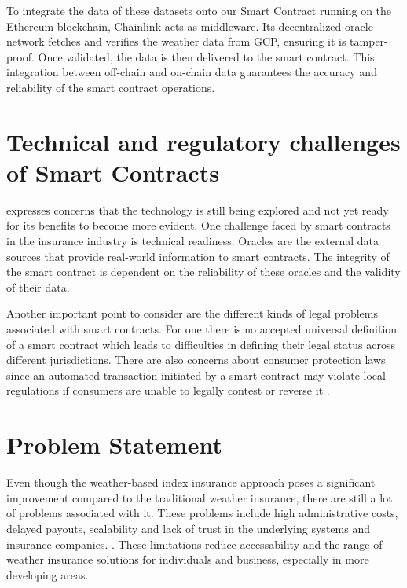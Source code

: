  To integrate the data of these datasets onto our Smart Contract running on the Ethereum blockchain, Chainlink acts as middleware. Its decentralized oracle network fetches and verifies the weather data from GCP, ensuring it is tamper-proof. Once validated, the data is then delivered to the smart contract. This integration between off-chain and on-chain data guarantees the accuracy and reliability of the smart contract operations. \autocite{goswami2022towards}
 
 \section{Technical and regulatory challenges of Smart Contracts}\label{section:regulatory_technical_challenges}
 
 \autocite{gatteschi2018blockchain} expresses concerns that the technology is still being explored and not yet ready for its benefits to become more evident. One challenge faced by smart contracts in the insurance industry is technical readiness. Oracles are the external data sources that provide real-world information to smart contracts. The integrity of the smart contract is dependent on the reliability of these oracles and the validity of their data. 
 
 Another important point to consider are the different kinds of legal problems associated with smart contracts. For one there is no accepted universal definition of a smart contract which leads to difficulties in defining their legal status across different jurisdictions. There are also concerns about consumer protection laws since an automated transaction initiated by a smart contract may violate local regulations if consumers are unable to legally contest or reverse it \autocite{ferreira2021regulating}.

\section{Problem Statement}\label{section:problem_statement}
Even though the weather-based index insurance approach poses a significant improvement compared to the traditional weather insurance, there are still a lot of problems associated with it. These problems include high administrative costs, delayed payouts, scalability and lack of trust in the underlying systems and insurance companies. \autocite{skees2008challenges}. These limitations reduce accessability and the range of weather insurance solutions for individuals and business, especially in more developing areas.


